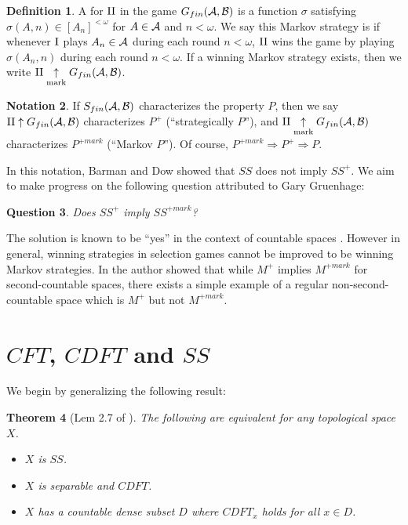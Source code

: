 \documentclass{amsart}
\theoremstyle{plain}
\newtheorem{theorem}{Theorem}
\newtheorem{question}[theorem]{Question}
\theoremstyle{definition}
\newtheorem{definition}[theorem]{Definition}
\newtheorem{notation}[theorem]{Notation}
\theoremstyle{remark}
\theoremstyle{plain}
\theoremstyle{definition}
\theoremstyle{remark}
\begin{document}
\begin{definition}
  A  for \(\mathrm{II}\) in the game
  \(G_{fin}(\mathcal{A},\mathcal{B})\)
  is a function \(\sigma\) satisfying
  \(\sigma(A,n)\in[A_n]^{<\omega}\) for
  \(A\in\mathcal{A}\) and \(n<\omega\). We say this Markov strategy is
   if whenever \(\mathrm{I}\) plays \(A_n\in\mathcal{A}\) during each
  round \(n<\omega\), \(\mathrm{II}\) wins the game by playing
  \(\sigma(A_n,n)\) during each round \(n<\omega\).
  If a winning Markov strategy exists, then we write
  \(\mathrm{II}\underset{\text{mark}}{\uparrow}G_{fin}(\mathcal{A},\mathcal{B})\).
\end{definition}

\begin{notation}
  If \(S_{fin}(\mathcal{A},\mathcal{B})\) characterizes the property \(P\),
  then we say \(\mathrm{II}\uparrow G_{fin}(\mathcal{A},\mathcal{B})\) characterizes
  \(P^+\) (``strategically \(P\)''), and
  \(\mathrm{II}\underset{\text{mark}}{\uparrow}G_{fin}(\mathcal{A},\mathcal{B})\) characterizes
  \(P^{+mark}\) (``Markov \(P\)'').
  Of course, \(P^{+mark}\Rightarrow P^+ \Rightarrow P\).
\end{notation}

In this notation,
Barman and Dow showed that \(SS\) does not imply
\(SS^+\). We aim to make progress on the following question attributed to
Gary Gruenhage:

\begin{question}\label{mainQuestion}
  Does \(SS^+\) imply \(SS^{+mark}\)?
\end{question}

The solution is known to be ``yes'' in the context of countable spaces
\cite{MR2678950}. However in general, winning strategies in selection games
cannot be improved to be winning Markov strategies. In
\cite{clontzMengerGamePreprint} the author showed that while \(M^+\) implies
\(M^{+mark}\) for second-countable spaces, there exists a simple
example of a regular non-second-countable space which is
\(M^+\) but not \(M^{+mark}\).



\section{\(CFT\), \(CDFT\) and \(SS\)}

We begin by generalizing the following result:

\begin{theorem}[Lem 2.7 of \cite{MR2678950}]
  The following are equivalent for any topological space \(X\).
  \begin{itemize}
    \item \(X\) is \(SS\).
    \item \(X\) is separable and \(CDFT\).
    \item \(X\) has a countable dense subset \(D\) where
          \(CDFT_x\) holds for all \(x\in D\).
  \end{itemize}
\end{theorem}
\end{document}
